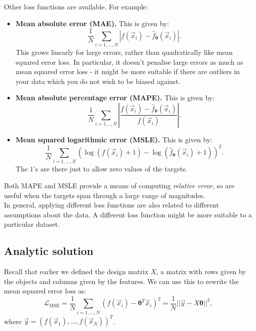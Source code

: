 \newpage
Other loss functions are available. For example:
\begin{itemize}
\item \textbf{Mean absolute error (MAE).} This is given by:
\begin{equation*}
\frac{1}{N} \sum_{i=1,...,N} \left|f(\vec{x}_i) - \hat{f}_{\pmb{\theta}}(\vec{x}_i)\right|.
\end{equation*}
This grows linearly for large errors, rather than quadratically like mean squared error loss. In particular, it doesn't penalise large errors as much as mean squared error loss - it might be more suitable if there are outliers in your data which you do not wish to be biased against.
\item \textbf{Mean absolute percentage error (MAPE).} This is given by:
\begin{equation*}
\frac{1}{N} \sum_{i=1,..,N} \left| \frac{f(\vec{x}_i) - \hat{f}_{\pmb{\theta}}(\vec{x}_i)}{f(\vec{x}_i)} \right|.
\end{equation*} 
\item \textbf{Mean squared logarithmic error (MSLE).} This is given by:
\begin{equation*}
\frac{1}{N} \sum_{i=1,...,N} \left( \log(f(\vec{x}_i) + 1) - \log(\hat{f}_{\pmb{\theta}}(\vec{x}_i) + 1) \right)^2.
\end{equation*}
The $1$'s are there just to allow zero values of the targets. 
\end{itemize}
Both MAPE and MSLE provide a means of computing \textit{relative error}, so are useful when the targets span through a large range of magnitudes.\\

In general, applying different loss functions are also related to different assumptions about the data. A different loss function might be more suitable to a particular dataset.





\newpage
\subsection{Analytic solution}
Recall that earlier we defined the design matrix $X$, a matrix with rows given by the objects and columns given by the features. We can use this to rewrite the mean squared error loss as:
\begin{equation*}
\mathcal{L}_{\text{MSE}} = \frac{1}{N} \sum_{i=1,...,N} \left( f(\vec{x}_i) - \pmb{\theta}^T \vec{x}_i \right)^2 = \frac{1}{N} || \vec{y} - X \pmb{\theta} ||^2,
\end{equation*}
where $\vec{y} = (f(\vec{x}_1),...,f(\vec{x}_N))^T$.\\

